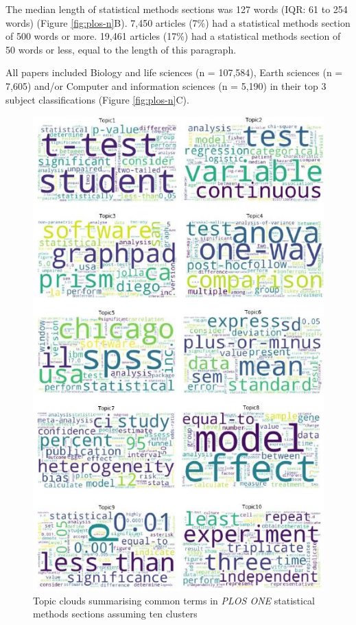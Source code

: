 \documentclass[12pt]{article}
\begin{document}
The median length of statistical methods sections was 127 words (IQR: 61
to 254 words) (Figure \ref{fig:plos-n}B). 7,450 articles (7\%) had a
statistical methods section of 500 words or more. 19,461 articles (17\%)
had a statistical methods section of 50 words or less, equal to the
length of this paragraph.

All papers included Biology and life sciences (n = 107,584), Earth
sciences (n = 7,605) and/or Computer and information sciences (n =
5,190) in their top 3 subject classifications (Figure
\ref{fig:plos-n}C).

\begin{figure}
\centering
\includegraphics{figures/plosone.10topics.jpg}
\caption{\label{fig:plot-10-topics}Topic clouds summarising common terms
in \emph{PLOS ONE} statistical methods sections assuming ten clusters}
\end{figure}
\end{document}
